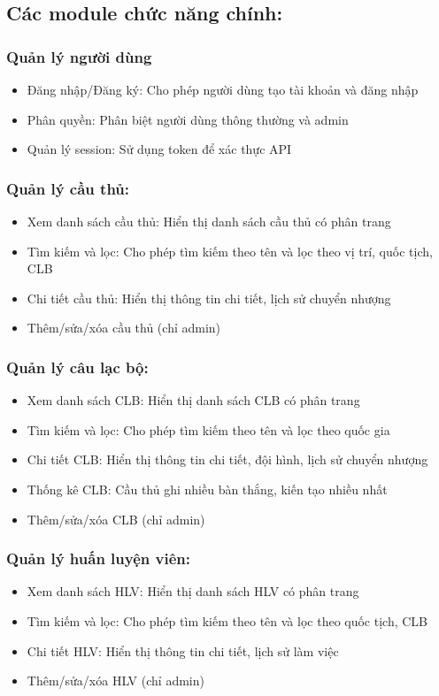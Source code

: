 \documentclass[../BTL.tex]{subfiles}
\begin{document}
\subsection{Các module chức năng chính:}
\subsubsection{Quản lý người dùng}
\begin{itemize}
    \item Đăng nhập/Đăng ký: Cho phép người dùng tạo tài khoản và đăng nhập
    \item Phân quyền: Phân biệt người dùng thông thường và admin
    \item Quản lý session: Sử dụng token để xác thực API
\end{itemize}
\subsubsection{Quản lý cầu thủ:}
\begin{itemize}
    \item Xem danh sách cầu thủ: Hiển thị danh sách cầu thủ có phân trang
    \item Tìm kiếm và lọc: Cho phép tìm kiếm theo tên và lọc theo vị trí, quốc tịch, CLB
    \item Chi tiết cầu thủ: Hiển thị thông tin chi tiết, lịch sử chuyển nhượng
    \item Thêm/sửa/xóa cầu thủ (chỉ admin)
\end{itemize}
\subsubsection{Quản lý câu lạc bộ:}
\begin{itemize}
    \item Xem danh sách CLB: Hiển thị danh sách CLB có phân trang
    \item Tìm kiếm và lọc: Cho phép tìm kiếm theo tên và lọc theo quốc gia
    \item Chi tiết CLB: Hiển thị thông tin chi tiết, đội hình, lịch sử chuyển nhượng
    \item Thống kê CLB: Cầu thủ ghi nhiều bàn thắng, kiến tạo nhiều nhất
    \item Thêm/sửa/xóa CLB (chỉ admin)
\end{itemize}
\subsubsection{Quản lý huấn luyện viên:}
\begin{itemize}
    \item Xem danh sách HLV: Hiển thị danh sách HLV có phân trang
    \item Tìm kiếm và lọc: Cho phép tìm kiếm theo tên và lọc theo quốc tịch, CLB
    \item Chi tiết HLV: Hiển thị thông tin chi tiết, lịch sử làm việc
    \item Thêm/sửa/xóa HLV (chỉ admin)
\end{itemize}
\end{document}
